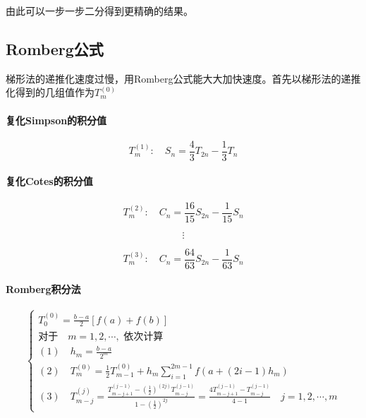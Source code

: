 \documentclass[12pt]{report}
\begin{document}
由此可以一步一步二分得到更精确的结果。

\subsection{Romberg公式}

梯形法的递推化速度过慢，用Romberg公式能大大加快速度。首先以梯形法的递推化得到的几组值作为$T_m^{(0)}$

\paragraph{复化Simpson的积分值}

\begin{equation} 
	T_m^{(1)}: \quad S_n = \frac{4}{3} T_{2n} - \frac{1}{3} T_n
	\tag{3.14} \label{3.14}
\end{equation}

\paragraph{复化Cotes的积分值}

\begin{equation}
	T_m^{(2)}: \quad C_n = \frac{16}{15} S_{2n} - \frac{1}{15} S_n
	\tag{3.15} \label{3.15}
\end{equation}

\[\vdots\]

\[
	T_m^{(3)}: \quad C_n = \frac{64}{63} S_{2n} - \frac{1}{63} S_n
\]

\paragraph{Romberg积分法}

\begin{equation} \tag{3.16} \label{3.16}
	\left\{\begin{array}{l}
	T_{0}^{(0)}=\frac{b-a}{2}[f(a)+f(b)] \\
	\text{对于} \quad m=1,2, \cdots, \text { 依次计算 } \\
	(1) \quad h_{m}=\frac{b-a}{2^{m}} \\
	(2) \quad T_{m}^{(0)}=\frac{1}{2} T_{m-1}^{(0)}+h_{m} \sum_{i=1}^{2 m-1} f\left(a+\left(2 i-1\right) h_{m}\right) \\
	(3) \quad T_{m-j}^{(j)}=\frac{T_{m-j+1}^{(j-1)}-\left(\frac{1}{2}\right)^{(2 j)} T_{m-j}^{(j-1)}}{1-\left(\frac{1}{2}\right)^{2 j}}=\frac{4 T_{m-j+1}^{(j-1)}-T_{m-j}^{(j-1)}}{4-1} \quad j=1,2, \cdots, m
	\end{array}\right.
\end{equation}
\end{document}
